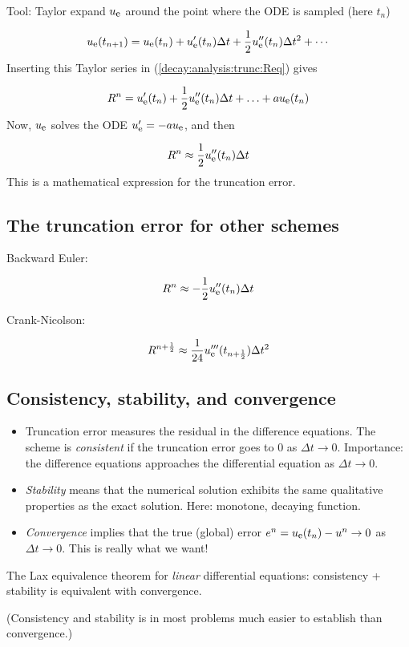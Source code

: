 \documentclass[%
oneside,                 %
final,                   %
10pt]{article}
\begin{document}
\noindent
Tool: Taylor expand $\uex$ around the point where the ODE is sampled
(here $t_n$)


\[ \uex(t_{n+1}) = \uex(t_n) + \uex'(t_n)\Delta t + \half\uex''(t_n)
\Delta t^2 + \cdots \]
Inserting this Taylor series in (\ref{decay:analysis:trunc:Req}) gives

\[ R^n = \uex'(t_n) + \half\uex''(t_n)\Delta t + \ldots + a\uex(t_n)\]
Now, $\uex$ solves the ODE $\uex'=-a\uex$, and then

\[ R^n \approx \half\uex''(t_n)\Delta t\]
This is a mathematical expression for the truncation error.

\subsection*{The truncation error for other schemes}

Backward Euler:

\[ R^n \approx -\half\uex''(t_n)\Delta t \]

Crank-Nicolson:

\[ R^{n+\half} \approx \frac{1}{24}\uex'''(t_{n+\half})\Delta t^2\]

\subsection*{Consistency, stability, and convergence}

  

\begin{itemize}
  \item Truncation error measures the residual in the difference equations.
    The scheme is \emph{consistent} if the truncation error goes to 0
    as $\Delta t\rightarrow 0$. Importance: the difference equations
    approaches the differential equation as $\Delta t\rightarrow 0$.

  \item \emph{Stability} means that the numerical solution exhibits the same
    qualitative properties as the exact solution. Here: monotone,
    decaying function.

  \item \emph{Convergence} implies that the true (global) error
    $e^n =\uex(t_n)-u^n\rightarrow 0$ as $\Delta t\rightarrow 0$.
    This is really what we want!
\end{itemize}

\noindent
The Lax equivalence theorem for \emph{linear} differential equations:
consistency + stability is equivalent with convergence.

(Consistency and stability is in most problems
much easier to establish than
convergence.)


\cleardoublepage{}  %
\printindex
\end{document}
